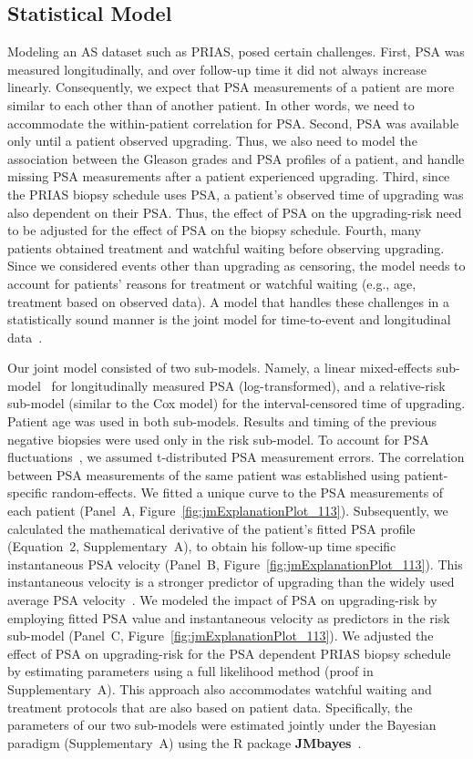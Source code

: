 \subsection{Statistical Model}
Modeling an AS dataset such as PRIAS, posed certain challenges. First, PSA was measured longitudinally, and over follow-up time it did not always increase linearly. Consequently, we expect that PSA measurements of a patient are more similar to each other than of another patient. In other words, we need to accommodate the within-patient correlation for PSA. Second, PSA was available only until a patient observed upgrading. Thus, we also need to model the association between the Gleason grades and PSA profiles of a patient, and handle missing PSA measurements after a patient experienced upgrading. Third, since the PRIAS biopsy schedule uses PSA, a patient's observed time of upgrading was also dependent on their PSA. Thus, the effect of PSA on the upgrading-risk need to be adjusted for the effect of PSA on the biopsy schedule. Fourth, many patients obtained treatment and watchful waiting before observing upgrading. Since we considered events other than upgrading as censoring, the model needs to account for patients' reasons for treatment or watchful waiting (e.g., age, treatment based on observed data). A model that handles these challenges in a statistically sound manner is the joint model for time-to-event and longitudinal data~\citep{tomer2019,coley2017prediction,rizopoulos2012joint}.

Our joint model consisted of two sub-models. Namely, a linear mixed-effects sub-model~\citep{laird1982random} for longitudinally measured PSA (log-transformed), and a relative-risk sub-model (similar to the Cox model) for the interval-censored time of upgrading. Patient age was used in both sub-models. Results and timing of the previous negative biopsies were used only in the risk sub-model. To account for PSA fluctuations~\citep{nixon1997biological}, we assumed t-distributed PSA measurement errors. The correlation between PSA measurements of the same patient was established using patient-specific random-effects. We fitted a unique curve to the PSA measurements of each patient (Panel~A, Figure~\ref{fig:jmExplanationPlot_113}). Subsequently, we calculated the mathematical derivative of the patient's fitted PSA profile (Equation~2, Supplementary~A), to obtain his follow-up time specific instantaneous PSA velocity (Panel~B, Figure~\ref{fig:jmExplanationPlot_113}). This instantaneous velocity is a stronger predictor of upgrading than the widely used average PSA velocity~\citep{cooperberg2018refined}. We modeled the impact of PSA on upgrading-risk by employing fitted PSA value and instantaneous velocity as predictors in the risk sub-model (Panel~C, Figure~\ref{fig:jmExplanationPlot_113}). We adjusted the effect of PSA on upgrading-risk for the PSA dependent PRIAS biopsy schedule by estimating parameters using a full likelihood method (proof in Supplementary~A). This approach also accommodates watchful waiting and treatment protocols that are also based on patient data. Specifically, the parameters of our two sub-models were estimated jointly under the Bayesian paradigm (Supplementary~A) using the R package \textbf{JMbayes}~\citep{rizopoulosJMbayes}.

